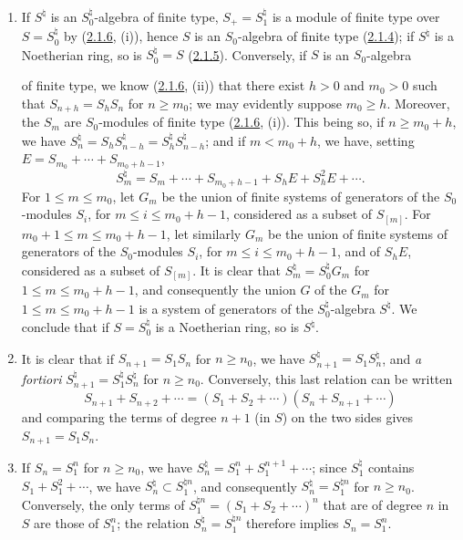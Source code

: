 \begin{enumerate}
\item[\rm(i)] If $S^\natural$ is an $S_0^\natural$-algebra of finite type,
$S_+=S_1^\natural$ is a module of finite type over $S=S_0^\natural$ by
(\hyperref[II.2.1.6]{2.1.6}, (i)), hence $S$ is an $S_0$-algebra of finite
type (\hyperref[II.2.1.4]{2.1.4}); if $S^\natural$ is a Noetherian
ring, so is $S_0^\natural=S$
(\hyperref[II.2.1.5]{2.1.5}). Conversely, if $S$ is an $S_0$-algebra

of finite type, we know (\hyperref[II.2.1.6]{2.1.6}, (ii)) that there exist
$h>0$ and $m_0>0$ such that $S_{n+h}=S_hS_n$ for $n\geq m_0$; we may
evidently suppose $m_0\geq h$. Moreover, the $S_m$ are $S_0$-modules
of finite type (\hyperref[II.2.1.6]{2.1.6}, (i)). This being so, if
$n\geq m_0+h$, we have $S_n^\natural=S_hS_{n-h}^\natural
=S_h^\natural S_{n-h}^\natural$; and if $m<m_0+h$, we have, setting
$E=S_{m_0}+\cdots+S_{m_0+h-1}$,
\[
  S_m^\natural=S_m+\cdots+S_{m_0+h-1}+S_hE+S_h^2E+\cdots.
\]
For $1\leq m\leq m_0$, let $G_m$ be the union of finite systems of
generators of the $S_0$-modules $S_i$, for $m\leq i\leq m_0+h-1$,
considered as a subset of $S_{[m]}$. For $m_0+1\leq m\leq m_0+h-1$, let
similarly $G_m$ be the union of finite systems of generators of the $S_0$-modules
$S_i$, for $m\leq i\leq m_0+h-1$, and of $S_hE$, considered as a subset of
$S_{[m]}$. It is clear that $S_m^\natural=S_0^\natural G_m$ for
$1\leq m\leq m_0+h-1$, and consequently the union $G$ of the $G_m$ for
$1\leq m\leq m_0+h-1$ is a system of generators of the
$S_0^\natural$-algebra $S^\natural$. We conclude that if $S=S_0^\natural$
is a Noetherian ring, so is $S^\natural$.

\item[\rm(ii)] It is clear that if $S_{n+1}=S_1S_n$ for $n\geq n_0$, we have
$S_{n+1}^\natural=S_1S_n^\natural$, and \emph{a fortiori}
$S_{n+1}^\natural=S_1^\natural S_n^\natural$ for $n\geq n_0$.
Conversely, this last relation can be written
\[
  S_{n+1}+S_{n+2}+\cdots=(S_1+S_2+\cdots)(S_n+S_{n+1}+\cdots)
\]
and comparing the terms of degree $n+1$ (in $S$) on the two sides gives
$S_{n+1}=S_1S_n$.

\item[\rm(iii)] If $S_n=S_1^n$ for $n\geq n_0$, we have
$S_n^\natural=S_1^n+S_1^{n+1}+\cdots$; since $S_1^\natural$ contains
$S_1+S_1^2+\cdots$, we have $S_n^\natural\subset S_1^{\natural n}$, and consequently
$S_n^\natural=S_1^{\natural n}$ for $n\geq n_0$. Conversely, the only
terms of $S_1^{\natural n}=(S_1+S_2+\cdots)^n$ that are of degree $n$ in
$S$ are those of $S_1^n$; the relation $S_n^\natural=S_1^{\natural n}$
therefore implies $S_n=S_1^n$.


\end{enumerate}
